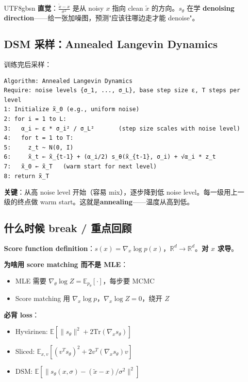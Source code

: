 \documentclass[11pt]{article}
\begin{document}
\begin{CJK}{UTF8}{gbsn}
\textbf{直觉}：$\frac{\tilde{x} - x}{\sigma^2}$ 是从 noisy $x$ 指向 clean $\tilde{x}$ 的方向。$s_\theta$ 在学 \textbf{denoising direction}——给一张加噪图，预测"应该往哪边走才能 denoise"。

\subsection{DSM 采样：Annealed Langevin Dynamics}

训练完后采样：

\begin{verbatim}
Algorithm: Annealed Langevin Dynamics
Require: noise levels {σ_1, ..., σ_L}, base step size ε, T steps per level
1: Initialize x̃_0 (e.g., uniform noise)
2: for i = 1 to L:
3:   α_i ← ε * σ_i² / σ_L²       (step size scales with noise level)
4:   for t = 1 to T:
5:     z_t ~ N(0, I)
6:     x̃_t ← x̃_{t-1} + (α_i/2) s_θ(x̃_{t-1}, σ_i) + √α_i * z_t
7:   x̃_0 ← x̃_T   (warm start for next level)
8: return x̃_T
\end{verbatim}

\textbf{关键}：从高 noise level 开始（容易 mix），逐步降到低 noise level。每一级用上一级的终点做 warm start。这就是\textbf{annealing}——温度从高到低。

\subsection{什么时候 break / 重点回顾}

\textbf{Score function definition}：$s(x) = \nabla_x \log p(x)$，$\mathbb{R}^d \to \mathbb{R}^d$。\textbf{对 $x$ 求导}。

\textbf{为啥用 score matching 而不是 MLE}：
\begin{itemize}[nosep]
  \item MLE 需要 $\nabla_\theta \log Z = \mathbb{E}_{p_\theta}[\cdot]$，每步要 MCMC
  \item Score matching 用 $\nabla_x \log p$，$\nabla_x \log Z = 0$，绕开 $Z$
\end{itemize}

\textbf{必背 loss}：
\begin{itemize}[nosep]
  \item Hyvärinen: $\mathbb{E}[\|s_\theta\|^2 + 2 \text{Tr}(\nabla_x s_\theta)]$
  \item Sliced: $\mathbb{E}_{x, v}[(v^T s_\theta)^2 + 2 v^T (\nabla_x s_\theta) v]$
  \item DSM: $\mathbb{E}[\|s_\theta(x, \sigma) - (\tilde{x} - x)/\sigma^2\|^2]$
\end{itemize}


\end{CJK}
\end{document}
